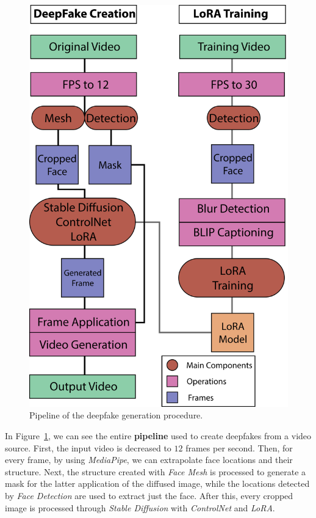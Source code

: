 \documentclass[sn-mathphys,Numbered]{sn-jnl}
\theoremstyle{thmstyleone}%
\theoremstyle{thmstyletwo}%
\theoremstyle{thmstylethree}%
\begin{document}
\begin{figure}[t]
	\centering
	\includegraphics[scale=0.65]{img/svg/Info.png}
	\caption{Pipeline of the deepfake generation procedure.}\label{fig:project}
\end{figure}




In Figure~\ref{fig:project}, we can see the entire \textbf{pipeline} used to create deepfakes from a video source. 
First, the input video is decreased to $12$ frames per second. Then, for every frame, by using \emph{MediaPipe}, we can extrapolate face locations and their structure.  Next, the structure created with \emph{Face Mesh} is processed to generate a mask for the latter application of the diffused image, 
while the locations detected by \emph{Face Detection} are used to extract just the face. After this, every cropped image is processed through \emph{Stable Diffusion} with \emph{ControlNet} and \emph{LoRA}. 
\end{document}
